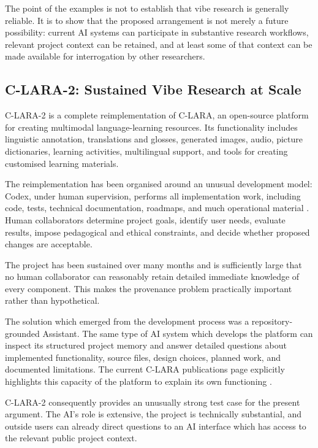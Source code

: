 The point of the examples is not to establish that vibe research is generally reliable. It is to show that the proposed arrangement is not merely a future possibility: current AI systems can participate in substantive research workflows, relevant project context can be retained, and at least some of that context can be made available for interrogation by other researchers.


\subsection{C-LARA-2: Sustained Vibe Research at Scale}

C-LARA-2 is a complete reimplementation of C-LARA, an open-source platform for creating multimodal language-learning resources. Its functionality includes linguistic annotation, translations and glosses, generated images, audio, picture dictionaries, learning activities, multilingual support, and tools for creating customised learning materials.

The reimplementation has been organised around an unusual development model: Codex, under human supervision, performs all implementation work, including code, tests, technical documentation, roadmaps, and much operational material \citep{bediEtAl2026clara2}. Human collaborators determine project goals, identify user needs, evaluate results, impose pedagogical and ethical constraints, and decide whether proposed changes are acceptable.

The project has been sustained over many months and is sufficiently large that no human collaborator can reasonably retain detailed immediate knowledge of every component. This makes the provenance problem practically important rather than hypothetical.

The solution which emerged from the development process was a repository-grounded Assistant. The same type of AI system which develops the platform can inspect its structured project memory and answer detailed questions about implemented functionality, source files, design choices, planned work, and documented limitations. The current C-LARA publications page explicitly highlights this capacity of the platform to explain its own functioning \citep{claradocuments2026}.

C-LARA-2 consequently provides an unusually strong test case for the present argument. The AI's role is extensive, the project is technically substantial, and outside users can already direct questions to an AI interface which has access to the relevant public project context.

